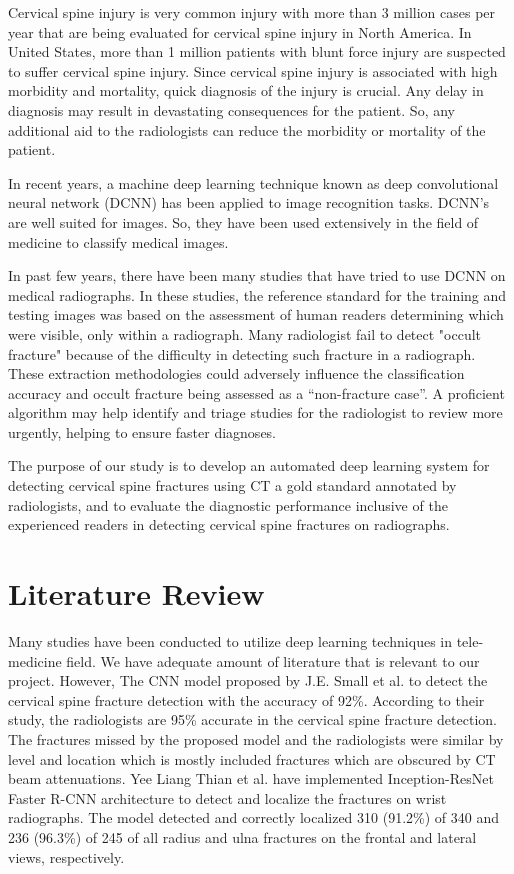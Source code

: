 \documentclass[pdflatex,sn-mathphys]{sn-jnl}%
\theoremstyle{thmstyleone}%
\theoremstyle{thmstyletwo}%
\theoremstyle{thmstylethree}%
\begin{document}
Cervical spine injury is very common injury with more than 3 million cases per year that are being evaluated for cervical spine injury in North America\cite{Milby:2008tt}. In United States, more than 1 million patients with blunt force injury are suspected to suffer cervical spine injury\cite{Minja:2018ud}. Since cervical spine injury is associated with high morbidity and mortality, quick diagnosis of the injury is crucial. Any delay in diagnosis may result in devastating consequences for the patient. So, any additional aid to the radiologists can reduce the morbidity or mortality of the patient.

In recent years, a machine deep learning technique known as deep convolutional neural network (DCNN) has been applied to image recognition tasks. DCNN's are well suited for images. So, they have been used extensively in the field of medicine to classify medical images. 

In past few years, there have been many studies that have tried to use DCNN\cite{Olczak:2017aa}\cite{Kim:2018aa}\cite{Chung:2018aa} on medical radiographs. In these studies, the reference standard for the training and testing images was based on the assessment of human readers determining which were visible, only within a radiograph. Many radiologist fail to detect "occult fracture" because of the difficulty in detecting such fracture in a radiograph. These extraction methodologies could adversely influence the classification accuracy and occult fracture being assessed as a “non-fracture case”. A proficient algorithm may help identify and triage studies for the radiologist to review more urgently, helping to ensure faster diagnoses.

The purpose of our study is to develop an automated deep learning system for detecting cervical spine fractures using CT a gold standard annotated by radiologists, and to evaluate the diagnostic performance inclusive of the experienced readers in detecting cervical spine fractures on radiographs. 

\section{Literature Review}\label{litrev}

Many studies have been conducted to utilize deep learning techniques in tele-medicine field. We have adequate amount of literature that is relevant to our project. However, The CNN model proposed by J.E. Small et al. to detect the cervical spine fracture detection with the accuracy of 92\%\cite{Small:2021aa}. According to their study, the radiologists are 95\% accurate in the cervical spine fracture detection. The fractures missed by the proposed model and the radiologists were similar by level and location which is mostly included fractures which are obscured by CT beam attenuations. Yee Liang Thian et al.\cite{Thian:2019aa} have implemented Inception-ResNet Faster R-CNN  architecture to detect and localize the fractures on wrist radiographs. The model detected and correctly localized 310 (91.2\%) of 340 and 236 (96.3\%) of 245 of all radius and ulna fractures on the frontal and lateral views, respectively.
\end{document}
